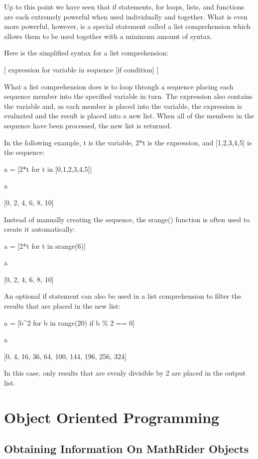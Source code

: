 \documentclass[12pt,oneside]{book}
\begin{document}
Up to this point we have seen that if statements, for loops, lists, and functions are each extremely powerful when used individually and together. What is even more powerful, however, is a special statement called a list comprehension which allows them to be used together with a minimum amount of syntax. 

Here is the simplified syntax for a list comprehension:


[ expression for variable in sequence [if condition] ]


What a list comprehension does is to loop through a sequence placing each sequence member into the specified variable in turn. The expression also contains the variable and, as each member is placed into the variable, the expression is evaluated and the result is placed into a new list. When all of the members in the sequence have been processed, the new list is returned. 


In the following example, t is the variable, 2*t is the expression, and [1,2,3,4,5] is the sequence: 

a = [2*t for t in [0,1,2,3,4,5]]

a

{\textbar}

[0, 2, 4, 6, 8, 10]

Instead of manually creating the sequence, the srange() function is often used to create it automatically: 

a = [2*t for t in srange(6)]

a

{\textbar}

[0, 2, 4, 6, 8, 10]

An optional if statement can also be used in a list comprehension to filter the results that are placed in the new list: 

a = [b\^{}2 for b in range(20) if b \% 2 == 0]

a

{\textbar}

[0, 4, 16, 36, 64, 100, 144, 196, 256, 324]

In this case, only results that are evenly divisible by 2 are placed in the output list. 
\chapter[Object Oriented Programming]{Object Oriented Programming}

\section[Obtaining Information On MathRider Objects]{Obtaining Information On MathRider Objects}
\end{document}
